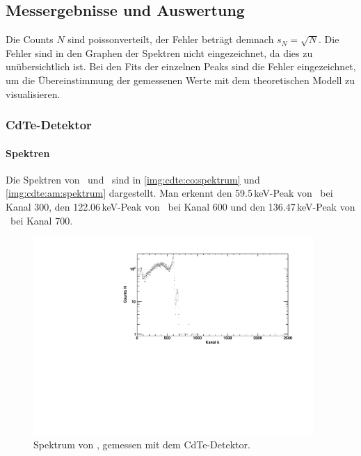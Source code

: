 \subsection{Messergebnisse und Auswertung}
Die Counts $N$ sind poissonverteilt, der Fehler beträgt demnach $s_N = \sqrt{N}$. Die Fehler sind in den Graphen der Spektren nicht eingezeichnet, 
da dies zu unübersichtlich ist. Bei den Fits der einzelnen Peaks sind die Fehler eingezeichnet, um die Übereinstimmung der gemessenen Werte 
mit dem theoretischen Modell zu visualisieren.
\subsubsection{CdTe-Detektor}
\paragraph{Spektren}
Die Spektren von \co\ und \am\ sind in \autoref{img:cdte:co:spektrum} und \autoref{img:cdte:am:spektrum} dargestellt. Man erkennt den 59.5\,keV-Peak 
von \am\, bei Kanal 300, den 122.06\,keV-Peak von \co\, bei Kanal 600 und den 136.47\,keV-Peak von \co\, bei Kanal 700.
\begin{figure}[H]
\begin{center}
  \includegraphics[width=0.95\textwidth]{../img/part3/Co-CdTe_spectrum.pdf}
  \caption{Spektrum von \co, gemessen mit dem CdTe-Detektor.}
  \label{img:cdte:co:spektrum}
\end{center}
\end{figure}


